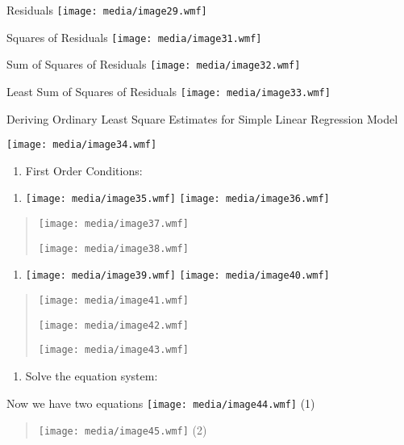 Residuals \texttt{[image: media/image29.wmf]}

Squares of Residuals \texttt{[image: media/image31.wmf]}

Sum of Squares of Residuals \texttt{[image: media/image32.wmf]}

Least Sum of Squares of Residuals \texttt{[image: media/image33.wmf]}

Deriving Ordinary Least Square Estimates for Simple Linear Regression
Model

\texttt{[image: media/image34.wmf]}

\begin{enumerate}
\def\labelenumi{\arabic{enumi}.}
\item
  First Order Conditions:
\end{enumerate}

\begin{enumerate}
\def\labelenumi{\alph{enumi}.}
\item
  \texttt{[image: media/image35.wmf]}
  \texttt{[image: media/image36.wmf]}
\end{enumerate}

\begin{quote}
\texttt{[image: media/image37.wmf]}

\texttt{[image: media/image38.wmf]}
\end{quote}

\begin{enumerate}
\def\labelenumi{\alph{enumi}.}
\setcounter{enumi}{1}
\item
  \texttt{[image: media/image39.wmf]}
  \texttt{[image: media/image40.wmf]}
\end{enumerate}

\begin{quote}
\texttt{[image: media/image41.wmf]}

\texttt{[image: media/image42.wmf]}

\texttt{[image: media/image43.wmf]}
\end{quote}

\begin{enumerate}
\def\labelenumi{\arabic{enumi}.}
\setcounter{enumi}{1}
\item
  Solve the equation system:
\end{enumerate}

Now we have two equations \texttt{[image: media/image44.wmf]} (1)

\begin{quote}
\texttt{[image: media/image45.wmf]} (2)
\end{quote}


